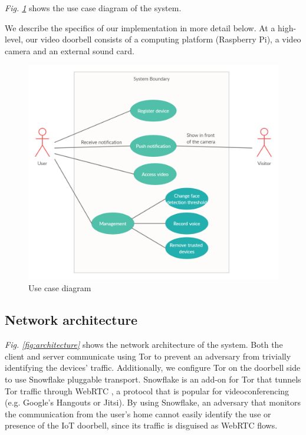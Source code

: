 \textit{Fig. \ref{fig:usecase}} shows the use case diagram of the system.

We describe the specifics of our implementation in more detail below. At a high-level, our video doorbell consists of a computing platform (Raspberry Pi), a video camera and an external sound card.

\begin{figure}
	\includegraphics[width=\linewidth]{Use_case_diagram.png}
	\caption{Use case diagram}
	\label{fig:usecase}
\end{figure}

\subsection{Network architecture}
\label{sec:netarch}
\textit{Fig. \ref{fig:architecture}} shows the network architecture of the system. Both the client and server communicate using Tor to prevent an adversary from trivially identifying the devices' traffic. Additionally, we configure Tor on the doorbell side to use Snowflake pluggable transport. Snowflake is an add-on for Tor that tunnels Tor traffic through WebRTC \cite{macmillan2020evaluating}, a protocol that is popular for videoconferencing (e.g. Google's Hangouts or Jitsi). By using Snowflake, an adversary that monitors the communication from the user's home cannot easily identify the use or presence of the IoT doorbell, since its traffic is disguised as WebRTC flows.

